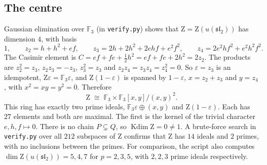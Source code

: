 \documentclass[11pt]{article}
\theoremstyle{definition}
\theoremstyle{remark}
\newcommand{\F}{\mathbb{F}}
\newcommand{\Z}{\mathrm{Z}}
\newcommand{\slt}{\mathfrak{sl}_2}
\newcommand{\kdim}{\operatorname{Kdim}}
\begin{document}
\subsection{The centre}
Gaussian elimination over $\F_3$ (in \texttt{verify.py}) shows that $\Z=\Z(u(\slt))$ has dimension
$4$, with basis
\[
1,\qquad z_2=h+h^2+ef,\qquad z_3=2h+2h^2+2ehf+e^2f^2,\qquad z_4=2e^2hf^2+e^2h^2f^2 .
\]
The Casimir element is $C=ef+fe+\tfrac12h^2=ef+fe+2h^2=2z_2$. The products are
$z_2^2=z_3$, $z_2z_3=-z_3$, $z_3^2=z_3$ and $z_2z_4=z_3z_4=z_4^2=0$. So $\varepsilon=z_3$ is an
idempotent, $\Z\varepsilon=\F_3\varepsilon$, and $\Z(1-\varepsilon)$ is spanned by $1-\varepsilon$,
$x=z_2+z_3$ and $y=z_4$, with $x^2=xy=y^2=0$. Therefore
\[
\Z\;\cong\;\F_3\times\F_3[x,y]/(x,y)^2 .
\]
This ring has exactly two prime ideals, $\F_3\varepsilon\oplus(x,y)$ and $\Z(1-\varepsilon)$. Each
has $27$ elements and both are maximal. The first is the kernel of the trivial character
$e,h,f\mapsto0$. There is no chain $P\subsetneq Q$, so $\kdim\Z=0\neq1$. A brute-force search in
\texttt{verify.py} over all $212$ subspaces of $\Z$ confirms that $\Z$ has $14$ ideals and $2$
primes, with no inclusions between the primes. For comparison, the script also computes
$\dim\Z(u(\slt))=5,4,7$ for $p=2,3,5$, with $2,2,3$ prime ideals respectively.
\end{document}
